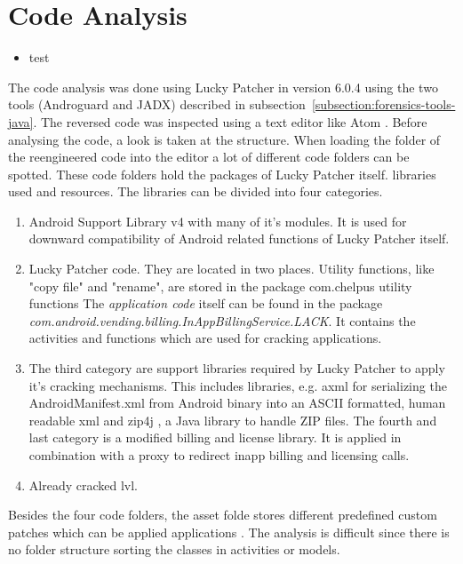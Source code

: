 \section{Code Analysis} \label{section:luckypatcher-analysis}
\begin{itemize}
    \item test
\end{itemize}
The code analysis was done using Lucky Patcher in version 6.0.4 using the two tools (Androguard and JADX) described in subsection~\ref{subsection:forensics-tools-java}.
The reversed code was inspected using a text editor like Atom \cite{atom}.
\newline
Before analysing the code, a look is taken at the structure.
When loading the folder of the reengineered code into the editor a lot of different code folders can be spotted.
These code folders hold the packages of Lucky Patcher itself. libraries used and resources.
The libraries can be divided into four categories.
\begin{enumerate}
\item Android Support Library v4 with many of it's modules.
It is used for downward compatibility of Android related functions of Lucky Patcher itself.
\item Lucky Patcher code.
They are located in two places.
Utility functions, like "copy file" and "rename", are stored in the package com.chelpus utility functions
The \textit{application code} itself can be found in the package \textit{com.android.vending.billing.InAppBillingService.LACK}.
It contains the activities and functions which are used for cracking applications.
\item The third category are support libraries required by Lucky Patcher to apply it's cracking mechanisms.
This includes libraries, e.g. axml \cite{axml} for serializing the AndroidManifest.xml from Android binary into an ASCII formatted, human readable xml and zip4j \cite{zip4j}, a Java library to handle ZIP files.
The fourth and last category is a modified billing and license library.
It is applied in combination with a proxy to redirect inapp billing and licensing calls.
\item Already cracked \gls{lvl}.
\end{enumerate}
Besides the four code folders, the asset folde stores different predefined custom patches which can be applied applications \cite{munteanLicense}.
\newline
The analysis is difficult since there is no folder structure sorting the classes in activities or models.
